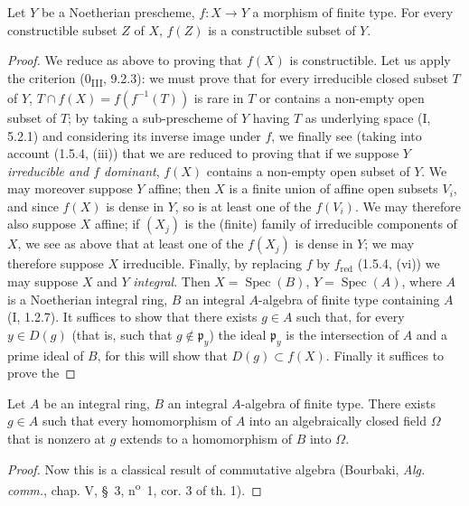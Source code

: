 \begin{corollary}[1.8.5]
\label{IV.1.8.5}
Let $Y$ be a Noetherian prescheme, $f:X\to Y$ a morphism of finite type.
For every constructible subset $Z$ of $X$, $f(Z)$ is a constructible subset
of $Y$.
\end{corollary}


\begin{proof}
We reduce as above to proving that $f(X)$ is constructible.
Let us apply the criterion (0\textsubscript{III}, 9.2.3): we must prove that
for every irreducible closed subset $T$ of $Y$, $T\cap f(X)=f(f^{-1}(T))$ is
rare in $T$ or contains a non-empty open subset of $T$; by taking a
sub-prescheme of $Y$ having $T$ as underlying space (I, 5.2.1) and
considering its inverse image under $f$, we finally see (taking into account
(1.5.4, (iii)) that we are reduced to proving that if we suppose $Y$
\emph{irreducible and $f$ dominant}, $f(X)$ contains a non-empty open subset
of $Y$. We may moreover suppose $Y$ affine; then $X$ is a finite union of
affine open subsets $V_i$, and since $f(X)$ is dense in $Y$, so is at least
one of the $f(V_i)$. We may therefore also suppose $X$ affine; if
$(X_j)$ is the (finite) family of irreducible components of $X$, we see
as above that at least one of the $f(X_j)$ is dense in $Y$; we may therefore
suppose $X$ irreducible. Finally, by replacing $f$ by $f_{\mathrm{red}}$
(1.5.4, (vi)) we may suppose $X$ and $Y$ \emph{integral}. Then
$X=\operatorname{Spec}(B)$, $Y=\operatorname{Spec}(A)$, where $A$ is a
Noetherian integral ring, $B$ an integral $A$-algebra of finite type
containing $A$ (I, 1.2.7). It suffices to show that there exists $g\in A$
such that, for every $y\in D(g)$ (that is, such that $g\notin\mathfrak p_y$)
the ideal $\mathfrak p_y$ is the intersection of $A$ and a prime ideal of $B$,
for this will show that $D(g)\subset f(X)$. Finally it suffices to prove the
\end{proof}

\begin{lemma}[1.8.5.1]
\label{IV.1.8.5.1}
Let $A$ be an integral ring, $B$ an integral $A$-algebra of finite type.
There exists $g\in A$ such that every homomorphism of $A$ into an
algebraically closed field $\Omega$ that is nonzero at $g$ extends to a
homomorphism of $B$ into $\Omega$.
\end{lemma}

\begin{proof}
Now this is a classical result of commutative algebra (Bourbaki,
\emph{Alg. comm.}, chap. V, \S~3, n\textsuperscript{o}~1, cor. 3 of th. 1).
\end{proof}


